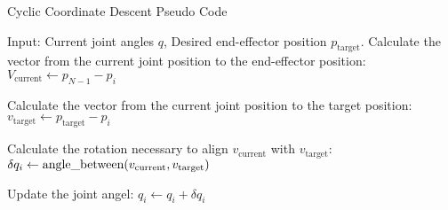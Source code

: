 \begin{algorithm}
    \caption{Cyclic Coordinate Descent Pseudo Code}\label{alg:CCD}
    \begin{algorithmic}
        \State{} Input: Current joint angles $q$, Desired end-effector position $p_\text{target}$.
                \State{} Calculate the vector from the current joint position to the end-effector position:
                \State{} $V_\text{current} \leftarrow p_{N-1} - p_i$

                \State{} Calculate the vector from the current joint position to the target position:
                \State{} $v_\text{target} \leftarrow p_\text{target} - p_i$

                \State{} Calculate the rotation necessary to align $v_\text{current}$ with $v_\text{target}$:
                \State{} $\delta q_i \leftarrow \text{angle\textunderscore between}(v_\text{current}, v_\text{target})$

                \State{} Update the joint angel:
                \State{} $q_i \leftarrow q_i + \delta q_i$
            \EndFor{}
        \EndWhile{}
\end{algorithmic}
\end{algorithm}